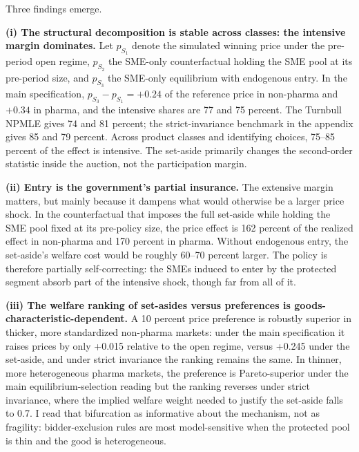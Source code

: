 Three findings emerge.

\noindent\textbf{(i) The structural decomposition is stable across classes: the intensive margin dominates.} Let $p_{S_1}$ denote the simulated winning price under the pre-period open regime, $p_{S_2}$ the SME-only counterfactual holding the SME pool at its pre-period size, and $p_{S_3}$ the SME-only equilibrium with endogenous entry. In the main specification, $p_{S_3} - p_{S_1} = +0.24$ of the reference price in non-pharma and $+0.34$ in pharma, and the intensive shares are 77 and 75 percent. The Turnbull NPMLE gives 74 and 81 percent; the strict-invariance benchmark in the appendix gives 85 and 79 percent. Across product classes and identifying choices, 75--85 percent of the effect is intensive. The set-aside primarily changes the second-order statistic inside the auction, not the participation margin.

\noindent\textbf{(ii) Entry is the government's partial insurance.} The extensive margin matters, but mainly because it dampens what would otherwise be a larger price shock. In the counterfactual that imposes the full set-aside while holding the SME pool fixed at its pre-policy size, the price effect is 162 percent of the realized effect in non-pharma and 170 percent in pharma. Without endogenous entry, the set-aside's welfare cost would be roughly 60--70 percent larger. The policy is therefore partially self-correcting: the SMEs induced to enter by the protected segment absorb part of the intensive shock, though far from all of it.

\noindent\textbf{(iii) The welfare ranking of set-asides versus preferences is goods-characteristic-dependent.} A 10 percent price preference is robustly superior in thicker, more standardized non-pharma markets: under the main specification it raises prices by only +0.015 relative to the open regime, versus +0.245 under the set-aside, and under strict invariance the ranking remains the same. In thinner, more heterogeneous pharma markets, the preference is Pareto-superior under the main equilibrium-selection reading but the ranking reverses under strict invariance, where the implied welfare weight needed to justify the set-aside falls to 0.7. I read that bifurcation as informative about the mechanism, not as fragility: bidder-exclusion rules are most model-sensitive when the protected pool is thin and the good is heterogeneous.

